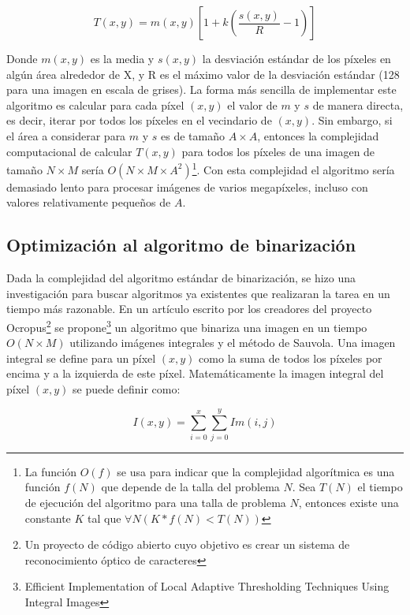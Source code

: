 \documentclass[a4paper, 11pt, oneside]{report}
\begin{document}
\begin{equation}\label{rSauvola}
	T(x,y)=m(x,y)\left[ 1 + k(\frac{s(x,y)}{R}-1) \right]
\end{equation}

Donde $m(x,y)$ es la media y $s(x,y)$ la desviación estándar de los píxeles en algún área alrededor de X, y R es el máximo valor de la desviación estándar (128 para una imagen en escala de grises). La forma más sencilla de implementar este algoritmo es calcular para cada píxel $(x,y)$ el valor de $m$ y $s$ de manera directa, es decir, iterar por todos los píxeles en el vecindario de $(x,y)$. Sin embargo, si el área a considerar para $m$ y $s$ es de tamaño $A \times A$, entonces la complejidad computacional de calcular $T(x,y)$ para todos los píxeles de una imagen de tamaño $N \times M$ sería $O(N \times M \times A^{2})$\footnote{La función $O(f)$ se usa para indicar que la complejidad algorítmica es una función $f(N)$ que depende de la talla del problema $N$. Sea $T(N)$ el tiempo de  ejecución del algoritmo para una talla de problema $N$, entonces existe una constante $K$ tal que  $\forall N ( K*f(N) < T(N) ) $}. Con esta complejidad el algoritmo sería demasiado lento para procesar imágenes de varios megapíxeles, incluso con valores relativamente pequeños de $A$.

\subsection{Optimización al algoritmo de binarización}

Dada la complejidad del algoritmo estándar de binarización, se hizo una investigación para buscar algoritmos ya existentes que realizaran la tarea en un tiempo más razonable. En un artículo escrito por los creadores del proyecto Ocropus\footnote{Un proyecto de código abierto cuyo objetivo es crear un sistema de reconocimiento óptico de caracteres} se propone\footnote{Efficient Implementation of Local Adaptive Thresholding Techniques Using Integral Images} un algoritmo que binariza una imagen en un tiempo $O(N \times M)$ utilizando imágenes integrales y el método de Sauvola. Una imagen integral se define para un píxel $(x, y)$ como la suma de todos los píxeles por encima y a la izquierda de este píxel. Matemáticamente la imagen integral del píxel $(x, y)$ se puede definir como:

\begin{equation}
	I(x, y) = \sum_{i=0}^{x}\sum_{j=0}^{y}Im(i, j)
\end{equation}
\end{document}
